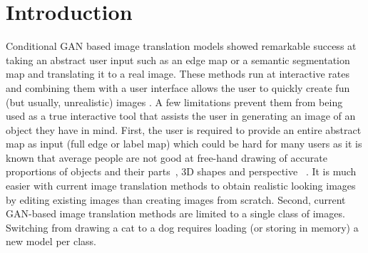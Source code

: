 


\section{Introduction}

Conditional GAN based image translation \cite{isola2016image2image,sangkloy2017scribbler,zhu2017unpaired} models showed remarkable success at taking an abstract user input such as an edge map or a semantic segmentation map and translating it to a real image. These methods run at interactive rates and combining them with a user interface allows the user to quickly create fun (but usually, unrealistic) images \cite{edges2cats_demo}. A few limitations prevent them from being used as a true interactive tool that assists the user in generating an image of an object they have in mind. First, the user is required to provide an entire abstract map as input (full edge or label map) which could be hard for many users as it is known that average people are not good at free-hand drawing of accurate proportions of objects and their parts~\cite{cohen1997can}, 3D shapes and perspective~\cite{schmidt2009expert} . It is much easier with current image translation methods to obtain realistic looking images by editing existing images \cite{dekel2018sparse,portenier2018faceshop}  than creating images from scratch. Second, current GAN-based image translation methods are limited to a single class of images. Switching from drawing a cat to a dog requires loading (or storing in memory) a new model per class.

